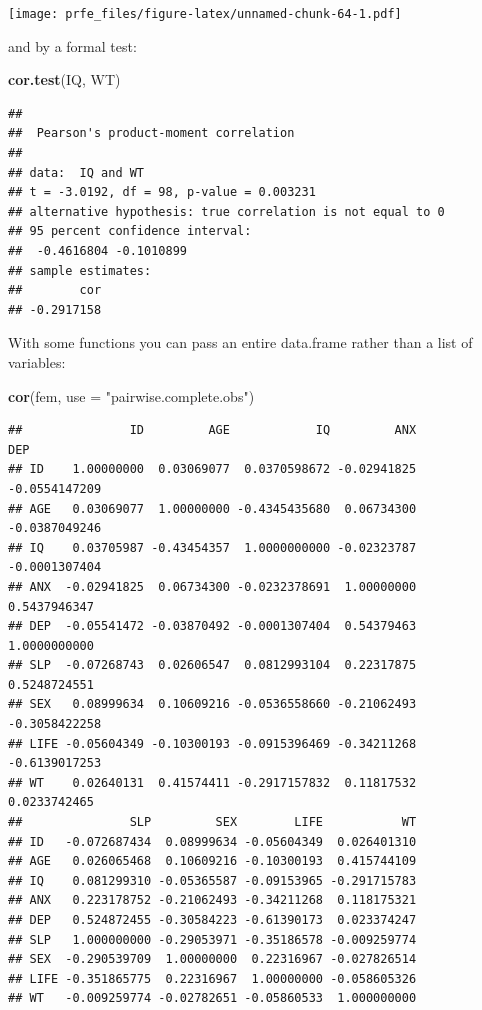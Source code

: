 \documentclass[]{book}
\newenvironment{Shaded}{\begin{snugshade}}{\end{snugshade}}
\newcommand{\KeywordTok}[1]{\textcolor[rgb]{0.13,0.29,0.53}{\textbf{#1}}}
\newcommand{\DataTypeTok}[1]{\textcolor[rgb]{0.13,0.29,0.53}{#1}}
\newcommand{\StringTok}[1]{\textcolor[rgb]{0.31,0.60,0.02}{#1}}
\newcommand{\NormalTok}[1]{#1}
\theoremstyle{definition}
\theoremstyle{definition}
\theoremstyle{definition}
\theoremstyle{remark}
\begin{document}
\texttt{[image: prfe\_files/figure-latex/unnamed-chunk-64-1.pdf]}

and by a formal test:

\begin{Shaded}
\begin{Highlighting}[]
\KeywordTok{cor.test}\NormalTok{(IQ, WT)}
\end{Highlighting}
\end{Shaded}

\begin{verbatim}
## 
##  Pearson's product-moment correlation
## 
## data:  IQ and WT
## t = -3.0192, df = 98, p-value = 0.003231
## alternative hypothesis: true correlation is not equal to 0
## 95 percent confidence interval:
##  -0.4616804 -0.1010899
## sample estimates:
##        cor 
## -0.2917158
\end{verbatim}

With some functions you can pass an entire data.frame rather than a list
of variables:

\begin{Shaded}
\begin{Highlighting}[]
\KeywordTok{cor}\NormalTok{(fem, }\DataTypeTok{use =} \StringTok{"pairwise.complete.obs"}\NormalTok{)}
\end{Highlighting}
\end{Shaded}

\begin{verbatim}
##               ID         AGE            IQ         ANX           DEP
## ID    1.00000000  0.03069077  0.0370598672 -0.02941825 -0.0554147209
## AGE   0.03069077  1.00000000 -0.4345435680  0.06734300 -0.0387049246
## IQ    0.03705987 -0.43454357  1.0000000000 -0.02323787 -0.0001307404
## ANX  -0.02941825  0.06734300 -0.0232378691  1.00000000  0.5437946347
## DEP  -0.05541472 -0.03870492 -0.0001307404  0.54379463  1.0000000000
## SLP  -0.07268743  0.02606547  0.0812993104  0.22317875  0.5248724551
## SEX   0.08999634  0.10609216 -0.0536558660 -0.21062493 -0.3058422258
## LIFE -0.05604349 -0.10300193 -0.0915396469 -0.34211268 -0.6139017253
## WT    0.02640131  0.41574411 -0.2917157832  0.11817532  0.0233742465
##               SLP         SEX        LIFE           WT
## ID   -0.072687434  0.08999634 -0.05604349  0.026401310
## AGE   0.026065468  0.10609216 -0.10300193  0.415744109
## IQ    0.081299310 -0.05365587 -0.09153965 -0.291715783
## ANX   0.223178752 -0.21062493 -0.34211268  0.118175321
## DEP   0.524872455 -0.30584223 -0.61390173  0.023374247
## SLP   1.000000000 -0.29053971 -0.35186578 -0.009259774
## SEX  -0.290539709  1.00000000  0.22316967 -0.027826514
## LIFE -0.351865775  0.22316967  1.00000000 -0.058605326
## WT   -0.009259774 -0.02782651 -0.05860533  1.000000000
\end{verbatim}
\end{document}
